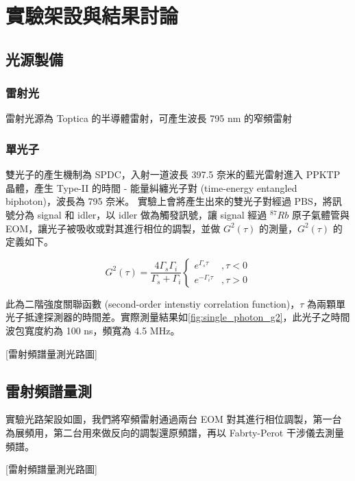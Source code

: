 \documentclass[class=NCU_thesis, crop=false]{standalone}
\begin{document}
\chapter{實驗架設與結果討論}


\section{光源製備}

\subsection{雷射光}
雷射光源為 Toptica 的半導體雷射，可產生波長 795 nm 的窄頻雷射

\subsection{單光子}
雙光子的產生機制為 SPDC，入射一道波長 397.5 奈米的藍光雷射進入 PPKTP 晶體，產生 Type-II 的時間 - 能量糾纏光子對 (time-energy entangled biphoton)，波長為 795 奈米。
實驗上會將產生出來的雙光子對經過 PBS，將訊號分為 signal 和 idler，以 idler 做為觸發訊號，讓 signal 經過 $^{87}Rb$ 原子氣體管與 EOM，讓光子被吸收或對其進行相位的調製，並做 $G^{2}(\tau)$ 的測量，$G^{2}(\tau)$ 的定義如下。

\begin{equation}
    G^{2}(\tau)=\frac{4\Gamma_{s}\Gamma_{i}}{\Gamma_{s}+\Gamma_{i}}\left\{\begin{matrix}
        e^{\Gamma_{s}\tau} & ,\tau<0\\
        e^{-\Gamma_{i}\tau} & ,\tau>0
        \end{matrix}\right.
\end{equation}

此為二階強度關聯函數 (second-order intenstiy correlation function)，$\tau$ 為兩顆單光子抵達探測器的時間差。實際測量結果如\cref{fig:single_photon_g2}，此光子之時間波包寬度約為 100 ns，頻寬為 4.5 MHz。

[雷射頻譜量測光路圖]

\section{雷射頻譜量測}

實驗光路架設如圖，我們將窄頻雷射通過兩台 EOM 對其進行相位調製，第一台為展頻用，第二台用來做反向的調製還原頻譜，再以 Fabrty-Perot 干涉儀去測量頻譜。

[雷射頻譜量測光路圖]
\end{document}
